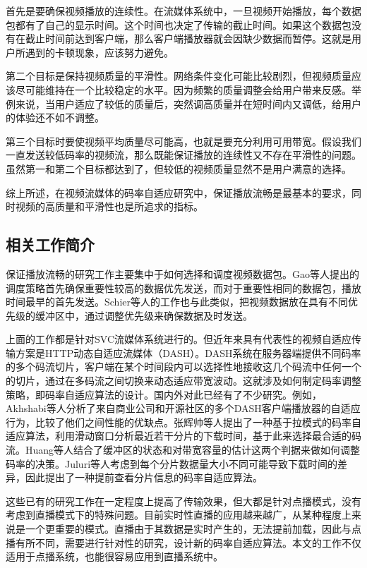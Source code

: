 首先是要确保视频播放的连续性。在流媒体系统中，一旦视频开始播放，每个数据包都有了自己的显示时间。这个时间也决定了传输的截止时间。如果这个数据包没有在截止时间前达到客户端，那么客户端播放器就会因缺少数据而暂停。这就是用户所遇到的卡顿现象，应该努力避免。

第二个目标是保持视频质量的平滑性。网络条件变化可能比较剧烈，但视频质量应该尽可能维持在一个比较稳定的水平。因为频繁的质量调整会给用户带来反感。举例来说，当用户适应了较低的质量后，突然调高质量并在短时间内又调低，给用户的体验还不如不调整。

第三个目标时要使视频平均质量尽可能高，也就是要充分利用可用带宽。假设我们一直发送较低码率的视频流，那么既能保证播放的连续性又不存在平滑性的问题。虽然第一和第二个目标都达到了，但较低的视频质量显然不是用户满意的选择。

综上所述，在视频流媒体的码率自适应研究中，保证播放流畅是最基本的要求，同时视频的高质量和平滑性也是所追求的指标。

\subsection{相关工作简介}

保证播放流畅的研究工作主要集中于如何选择和调度视频数据包。Gao等人\supercite{Gao2006}提出的调度策略首先确保重要性较高的数据优先发送，而对于重要性相同的数据包，播放时间最早的首先发送。Schier等人的工作\supercite{Schierl2010}也与此类似，把视频数据放在具有不同优先级的缓冲区中，通过调整优先级来确保数据及时发送。

上面的工作都是针对SVC流媒体系统进行的。但近年来具有代表性的视频自适应传输方案是HTTP动态自适应流媒体（DASH）\supercite{Sodagar2011}。DASH系统在服务器端提供不同码率的多个码流切片，客户端在某个时间段内可以选择性地接收这几个码流中任何一个的切片，通过在多码流之间切换来动态适应带宽波动。这就涉及如何制定码率调整策略，即码率自适应算法的设计。国内外对此已经有了不少研究。例如，Akhshabi等人\supercite{Akhshabi2012}分析了来自商业公司和开源社区的多个DASH客户端播放器的自适应行为，比较了他们之间性能的优缺点。张辉帅等人\supercite{Zhang2013}提出了一种基于拉模式的码率自适应算法，利用滑动窗口分析最近若干分片的下载时间，基于此来选择最合适的码流。Huang等人\supercite{Huang2015}结合了缓冲区的状态和对带宽容量的估计这两个判据来做如何调整码率的决策。Juluri\supercite{Juluri2015}等人考虑到每个分片数据量大小不同可能导致下载时间的差异，因此提出了一种提前查看分片信息的码率自适应算法。

这些已有的研究工作在一定程度上提高了传输效果，但大都是针对点播模式，没有考虑到直播模式下的特殊问题。目前实时性直播的应用越来越广，从某种程度上来说是一个更重要的模式。直播由于其数据是实时产生的，无法提前加载，因此与点播有所不同，需要进行针对性的研究，设计新的码率自适应算法。本文的工作不仅适用于点播系统，也能很容易应用到直播系统中。


